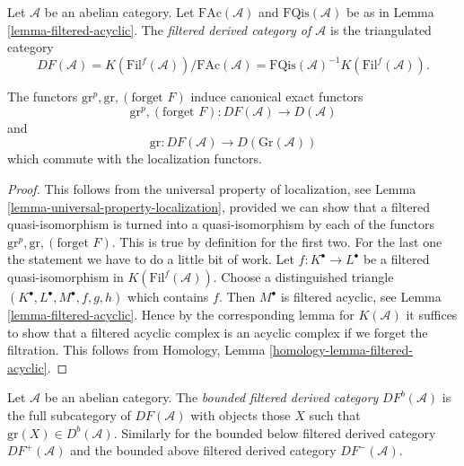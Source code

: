 \begin{definition}
\label{definition-filtered-derived}
Let $\mathcal{A}$ be an abelian category.
Let $\text{FAc}(\mathcal{A})$ and $\text{FQis}(\mathcal{A})$
be as in
Lemma \ref{lemma-filtered-acyclic}.
The {\it filtered derived category of $\mathcal{A}$}
is the triangulated category
$$
DF(\mathcal{A}) =
K(\text{Fil}^f(\mathcal{A}))/\text{FAc}(\mathcal{A}) =
\text{FQis}(\mathcal{A})^{-1} K(\text{Fil}^f(\mathcal{A})).
$$
\end{definition}

\begin{lemma}
\label{lemma-filtered-derived-functors}
The functors $\text{gr}^p, \text{gr}, (\text{forget }F)$ induce
canonical exact functors
$$
\text{gr}^p, (\text{forget }F):
DF(\mathcal{A})
\longrightarrow
D(\mathcal{A})
$$
and
$$
\text{gr}:
DF(\mathcal{A})
\longrightarrow
D(\text{Gr}(\mathcal{A}))
$$
which commute with the localization functors.
\end{lemma}

\begin{proof}
This follows from the universal property of localization, see
Lemma \ref{lemma-universal-property-localization},
provided we can show that a filtered quasi-isomorphism is turned
into a quasi-isomorphism by each of the functors
$\text{gr}^p, \text{gr}, (\text{forget }F)$. This is true by definition
for the first two. For the last one the statement we have to do a little
bit of work. Let $f : K^\bullet \to L^\bullet$ be a filtered
quasi-isomorphism in $K(\text{Fil}^f(\mathcal{A}))$.
Choose a distinguished triangle $(K^\bullet, L^\bullet, M^\bullet, f, g, h)$
which contains $f$. Then $M^\bullet$ is filtered acyclic, see
Lemma \ref{lemma-filtered-acyclic}.
Hence by the corresponding lemma for $K(\mathcal{A})$ it suffices
to show that a filtered acyclic complex is an acyclic complex if
we forget the filtration.
This follows from
Homology, Lemma \ref{homology-lemma-filtered-acyclic}.
\end{proof}

\begin{definition}
\label{definition-filtered-derived-bounded}
Let $\mathcal{A}$ be an abelian category.
The {\it bounded filtered derived category} $DF^b(\mathcal{A})$ is
the full subcategory of $DF(\mathcal{A})$ with objects those $X$
such that $\text{gr}(X) \in D^b(\mathcal{A})$.
Similarly for the bounded below filtered derived category
$DF^{+}(\mathcal{A})$ and the bounded above filtered derived category
$DF^{-}(\mathcal{A})$.
\end{definition}

